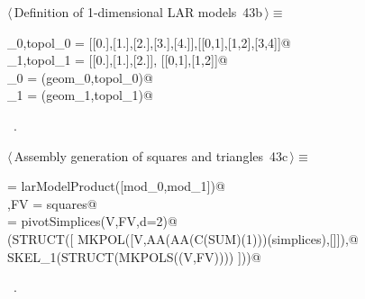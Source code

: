 \documentclass[11pt,oneside]{article}	%
\begin{document}
\begin{flushleft} \small \label{scrap93}
\protect{}$\langle\,$Definition of 1-dimensional LAR models\nobreak\ {\footnotesize 43b}$\,\rangle\equiv$
\vspace{-1ex}
\begin{list}{}{} \item
\mbox{}\verb@geom_0,topol_0 = [[0.],[1.],[2.],[3.],[4.]],[[0,1],[1,2],[3,4]]@\\
\mbox{}\verb@geom_1,topol_1 = [[0.],[1.],[2.]], [[0,1],[1,2]]@\\
\mbox{}\verb@mod_0 = (geom_0,topol_0)@\\
\mbox{}\verb@mod_1 = (geom_1,topol_1)@\\
\mbox{}\verb@@{\NWsep}
\end{list}
\vspace{-1ex}
\footnotesize\addtolength{\baselineskip}{-1ex}
\begin{list}{}{\setlength{\itemsep}{-\parsep}\setlength{\itemindent}{-\leftmargin}}
\item \NWtxtMacroRefIn\ .
\end{list}
\end{flushleft}

\begin{flushleft} \small \label{scrap94}
\protect{}$\langle\,$Assembly generation of squares and triangles\nobreak\ {\footnotesize 43c}$\,\rangle\equiv$
\vspace{-1ex}
\begin{list}{}{} \item
\mbox{}\verb@squares = larModelProduct([mod_0,mod_1])@\\
\mbox{}\verb@V,FV = squares@\\
\mbox{}\verb@simplices = pivotSimplices(V,FV,d=2)@\\
\mbox{}\verb@VIEW(STRUCT([ MKPOL([V,AA(AA(C(SUM)(1)))(simplices),[]]),@\\
\mbox{}\verb@              SKEL_1(STRUCT(MKPOLS((V,FV)))) ]))@\\
\mbox{}\verb@@{\NWsep}
\end{list}
\vspace{-1ex}
\footnotesize\addtolength{\baselineskip}{-1ex}
\begin{list}{}{\setlength{\itemsep}{-\parsep}\setlength{\itemindent}{-\leftmargin}}
\item \NWtxtMacroRefIn\ .
\end{list}
\end{flushleft}
\end{document}
